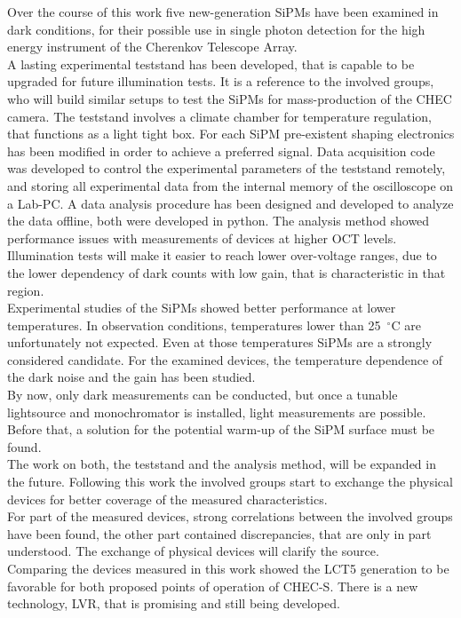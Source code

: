 \documentclass[12pt,article,type=msc,colorback,accentcolor=tud9c]{tudthesis}
\begin{document}
Over the course of this work five new-generation SiPMs have been examined in dark conditions, for their possible use in single photon detection for the high energy instrument of the Cherenkov Telescope Array.\\
A lasting experimental teststand has been developed, that is capable to be upgraded for future illumination tests. It is a reference to the involved groups, who will build similar setups to test the SiPMs for mass-production of the CHEC camera. The teststand involves a climate chamber for temperature regulation, that functions as a light tight box. For each SiPM pre-existent shaping electronics has been modified in order to achieve a preferred signal. Data acquisition code was developed to control the experimental parameters of the teststand remotely, and storing all experimental data from the internal memory of the oscilloscope on a Lab-PC. A data analysis procedure has been designed and developed to analyze the data offline, both were developed in python. The analysis method showed performance issues with measurements of devices at higher OCT levels. Illumination tests will make it easier to reach lower over-voltage ranges, due to the lower dependency of dark counts with low gain, that is characteristic in that region.\\

Experimental studies of the SiPMs showed better performance at lower temperatures. In observation conditions, temperatures lower than 25~$^\circ$C are unfortunately not expected. Even at those temperatures SiPMs are a strongly considered candidate. For the examined devices, the temperature dependence of the dark noise and the gain has been studied.\\
By now, only dark measurements can be conducted, but once a tunable lightsource and monochromator is installed, light measurements are possible. Before that, a solution for the potential warm-up of the SiPM surface must be found.\\
The work on both, the teststand and the analysis method, will be expanded in the future. Following this work the involved groups start to exchange the physical devices for better coverage of the measured characteristics.\\
For part of the measured devices, strong correlations between the involved groups have been found, the other part contained discrepancies, that are only in part understood. The exchange of physical devices will clarify the source.\\
Comparing the devices measured in this work showed the LCT5 generation to be favorable for both proposed points of operation of CHEC-S. There is a new technology, LVR, that is promising and still being developed.
\end{document}
